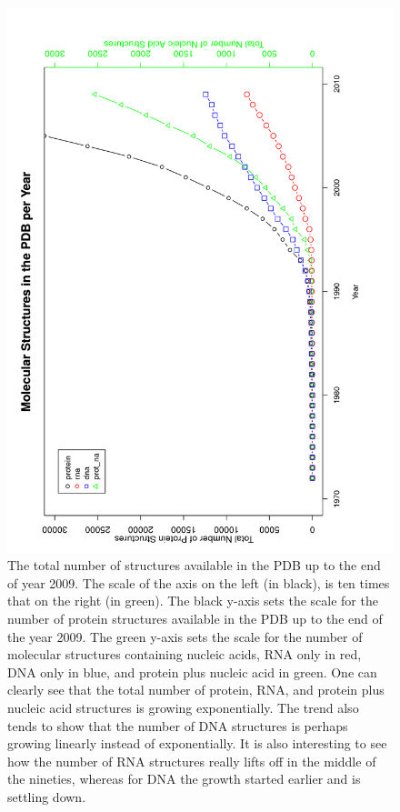 \begin{figure}
\centering
\includegraphics[angle=0, scale=0.3]{Chapter2/allmolecules_per_year.png}
\caption{The total number of structures available in the PDB up to the
  end of year 2009.  The scale of  the axis on the left (in black), is
  ten times  that on the right  (in green). The black  y-axis sets the
  scale for the  number of protein structures available  in the PDB up
  to the end of the year 2009. The green y-axis sets the scale for the
  number of molecular structures containing nucleic acids, RNA only in
  red, DNA only in blue, and  protein plus nucleic acid in green.  One
  can clearly see  that the total number of  protein, RNA, and protein
  plus  nucleic acid  structures is  growing exponentially.  The trend
  also  tends to show  that the  number of  DNA structures  is perhaps
  growing linearly  instead of exponentially.  It  is also interesting
  to see  how the  number of  RNA structures really  lifts off  in the
  middle of the  nineties, whereas for DNA the  growth started earlier
  and is settling down.}
\label{fig:allpolypdb}
\end{figure}

